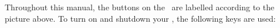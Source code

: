 \begin{center}
\end{center}

Throughout this manual, the buttons on the \dap\ are labelled according to the
picture above. To turn on and shutdown your \dap, the following keys are used:

